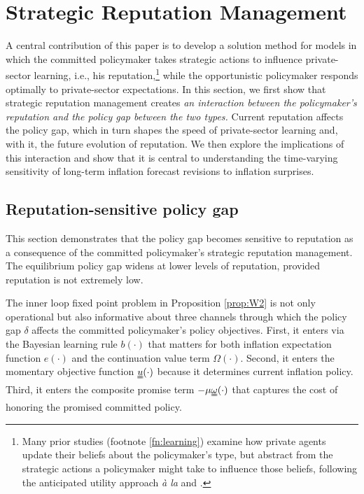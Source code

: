 \documentclass[12pt,letter,leqno]{article}
\theoremstyle{asn}
\theoremstyle{lem}
\theoremstyle{slem}
\theoremstyle{prop}
\theoremstyle{appprop}
\theoremstyle{rem}
\theoremstyle{defn}
\begin{document}
\section{Strategic Reputation Management}
A central contribution of this paper is to develop a 
solution method for models in which the committed 
policymaker takes strategic actions to influence 
private-sector learning, i.e., his reputation,\footnote
{Many prior studies (footnote \ref{fn:learning}) examine 
how private agents update their beliefs about the 
policymaker’s type, but abstract from the 
strategic actions a policymaker might take to influence 
those beliefs, following the anticipated utility approach \textit{à la} \cite{cogley_anticipated_2008} and \cite{jacobs_anticipated_1998}.} while the opportunistic policymaker
responds optimally to private-sector expectations. 
In this section, we first show that strategic reputation management creates \textit{an interaction between the policymaker's reputation and the policy gap between the two types.} Current reputation affects the policy gap, which in turn shapes the speed of private-sector learning and, with it, the future evolution of reputation. We then explore the implications of this interaction and show that it is central to understanding the time-varying sensitivity of long-term inflation forecast revisions to inflation surprises.

\subsection{Reputation-sensitive policy gap}\label{sec:policygap}
This section demonstrates that the policy gap becomes sensitive to reputation as a consequence of the committed policymaker's strategic reputation management. The equilibrium policy gap widens at lower levels of reputation, provided reputation is not extremely low.

The inner loop fixed point problem in Proposition \ref{prop:W2} is not only operational but also informative about three channels through which the policy gap $\delta$ affects the committed policymaker's policy objectives. First, it enters via the Bayesian learning rule $b(\cdot)$ that matters for both inflation expectation function $e(\cdot)$ and the continuation value term $\Omega(\cdot)$. Second, it enters the momentary objective function $\uuline{u}(\cdot)$ because it determines current inflation policy. Third, it enters the composite promise term $-\mu\uuline{\omega}(\cdot)$ that captures the cost of honoring the promised committed policy.
\end{document}
